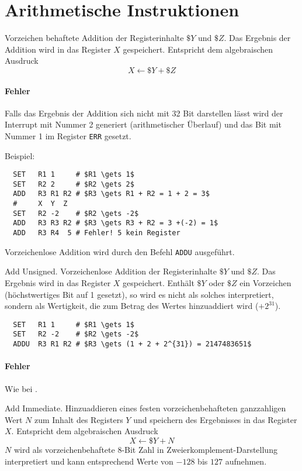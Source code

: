\section{Arithmetische Instruktionen} 

Vorzeichen behaftete Addition der Registerinhalte $\$Y$ und $\$Z$.
Das Ergebnis der Addition wird in das Register $X$ gespeichert.
Entspricht dem algebraischen Ausdruck
\[
    X \gets \$Y + \$Z
\]

\paragraph{Fehler}
Falls das Ergebnis der Addition sich nicht mit 32 Bit darstellen lässt wird der
Interrupt mit Nummer 2 generiert (arithmetischer Überlauf) und das Bit mit
Nummer 1 im Register \texttt{ERR} gesetzt.

Beispiel:
\begin{lstlisting}
  SET   R1 1     # $R1 \gets 1$
  SET   R2 2     # $R2 \gets 2$
  ADD   R3 R1 R2 # $R3 \gets R1 + R2 = 1 + 2 = 3$
  #     X  Y  Z
  SET   R2 -2    # $R2 \gets -2$
  ADD   R3 R3 R2 # $R3 \gets R3 + R2 = 3 +(-2) = 1$
  ADD   R3 R4  5 # Fehler! 5 kein Register
\end{lstlisting}
Vorzeichenlose Addition wird durch den Befehl \texttt{ADDU} ausgeführt.


\glqq Add Unsigned\grqq.
Vorzeichenlose Addition der Registerinhalte $\$Y$ und $\$Z$. Das Ergebnis wird
in das Register $X$ gespeichert. Enthält $\$Y$ oder $\$Z$ ein Vorzeichen
(höchstwertiges Bit auf 1 gesetzt), so wird es nicht als solches interpretiert,
sondern als Wertigkeit, die zum Betrag des Wertes hinzuaddiert wird ($+2^{31}$).

\begin{lstlisting}
  SET   R1 1     # $R1 \gets 1$
  SET   R2 -2    # $R2 \gets -2$
  ADDU  R3 R1 R2 # $R3 \gets (1 + 2 + 2^{31}) = 2147483651$
\end{lstlisting}

\paragraph{Fehler}
Wie bei .



\glqq Add Immediate\grqq.
Hinzuaddieren eines festen vorzeichenbehafteten ganzzahligen Wert $N$ zum Inhalt
des Registers $Y$ und speichern des Ergebnisses in das Register $X$.
Entspricht dem algebraischen Ausdruck
\[
  X \gets \$Y + N
\]
$N$ wird als vorzeichenbehaftete 8-Bit Zahl in Zweierkomplement-Darstellung
interpretiert und kann entsprechend Werte von $-128$ bis $127$ aufnehmen.

